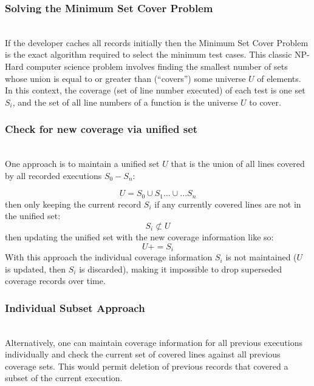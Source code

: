  \subsubsection{Solving the Minimum Set Cover Problem}\label{sec:tuning-2}
 \hfill\\
If the developer caches all records initially then the Minimum Set Cover Problem
\cite{hassin2005better} is the exact algorithm required to select the minimum test cases.
This classic NP-Hard computer science problem involves finding the smallest number
  of sets whose union is equal to or greater than (“covers”) some universe $U$ of elements.  
  In this context, the coverage (set of line number executed) of each test is one set $S_i$,
 and the set of all line numbers of a function is the universe $U$ to cover. 

\subsubsection{Check for new coverage via unified set}\label{sec:tuning-2}
\hfill\\
One approach is to maintain a unified set $U$ that is the union of all lines 
covered by all recorded executions $S_0-S_n$: 

\begin{equation*}
  U = S_0 \cup S_1 ...\cup... S_n
\end{equation*}
then only keeping the current record $S_i$ if any currently 
covered lines are not in the unified set:
\begin{equation*}
  S_i \not \subset U
\end{equation*}
then updating the unified set with the new coverage information like so:
\begin{equation*}
  U += S_i
\end{equation*} 
With this approach the individual coverage information $S_i$ is not maintained 
($U$ is updated, then $S_i$ is discarded), making it impossible to drop superseded 
coverage records over time.  

\subsubsection{Individual Subset Approach}\label{sec:tuning-2}
\hfill\\
Alternatively, one can maintain coverage information for all previous
 executions individually and check the current set of covered lines
  against all previous coverage sets.  This would permit deletion of 
  previous records that covered a subset of the current execution.  

